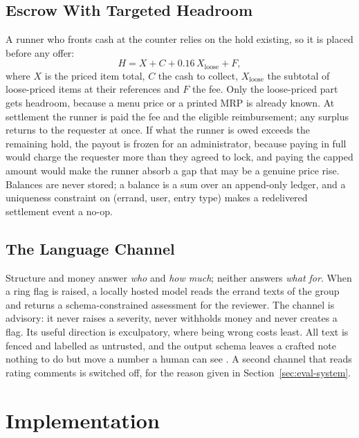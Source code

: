 \documentclass[journal]{IEEEtran}
\begin{document}
\subsection{Escrow With Targeted Headroom}\label{sec:design-escrow}
A runner who fronts cash at the counter relies on the hold existing, so it is placed
before any offer:
\begin{equation}
H = X + C + 0.16\,X_{\text{loose}} + F,
\end{equation}
where $X$ is the priced item total, $C$ the cash to collect, $X_{\text{loose}}$ the
subtotal of loose-priced items at their references and $F$ the fee. Only the
loose-priced part gets headroom, because a menu price or a printed MRP is already
known. At settlement the runner is paid the fee and the eligible reimbursement; any
surplus returns to the requester at once. If what the runner is owed exceeds the
remaining hold, the payout is frozen for an administrator, because paying in full
would charge the requester more than they agreed to lock, and paying the capped
amount would make the runner absorb a gap that may be a genuine price rise.
Balances are never stored; a balance is a sum over an append-only ledger, and a
uniqueness constraint on (errand, user, entry type) makes a redelivered settlement
event a no-op.

\subsection{The Language Channel}\label{sec:design-llm}
Structure and money answer \emph{who} and \emph{how much}; neither answers
\emph{what for}. When a ring flag is raised, a locally hosted model reads the errand
texts of the group and returns a schema-constrained assessment for the reviewer. The
channel is advisory: it never raises a severity, never withholds money and never
creates a flag. Its useful direction is exculpatory, where being wrong costs least.
All text is fenced and labelled as untrusted, and the output schema leaves a crafted
note nothing to do but move a number a human can see \cite{greshake2023not}. A second
channel that reads rating comments is switched off, for the reason given in
Section~\ref{sec:eval-system}.



\section{Implementation}\label{sec:impl}
\end{document}

